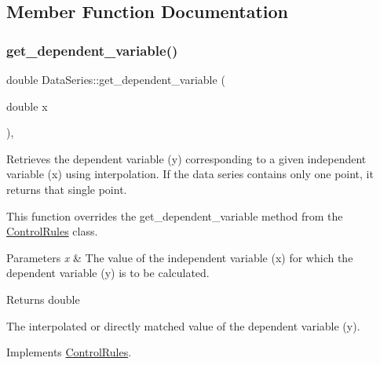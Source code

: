 \subsection{Member Function Documentation}
\mbox{\label{classDataSeries_a3cb684ebcbdd6d9969996f306bed8b53}} 
\subsubsection{\texorpdfstring{get\+\_\+dependent\+\_\+variable()}{get\_dependent\_variable()}\hspace{0.1cm}{\footnotesize\ttfamily [1/2]}}
{\footnotesize\ttfamily double Data\+Series\+::get\+\_\+dependent\+\_\+variable (\begin{DoxyParamCaption}\item[{double}]{x }\end{DoxyParamCaption})\hspace{0.3cm}{\ttfamily [override]}, {\ttfamily [virtual]}}



Retrieves the dependent variable ({\ttfamily y}) corresponding to a given independent variable ({\ttfamily x}) using interpolation. If the data series contains only one point, it returns that single point. 

This function overrides the {\ttfamily get\+\_\+dependent\+\_\+variable} method from the {\ttfamily \mbox{\hyperlink{classControlRules}{Control\+Rules}}} class.


\begin{DoxyParams}{Parameters}
{\em x} & The value of the independent variable ({\ttfamily x}) for which the dependent variable ({\ttfamily y}) is to be calculated.\\
\hline
\end{DoxyParams}
\begin{DoxyReturn}{Returns}
double 

The interpolated or directly matched value of the dependent variable ({\ttfamily y}). 
\end{DoxyReturn}


Implements \mbox{\hyperlink{classControlRules}{Control\+Rules}}.

\mbox{\label{classDataSeries_a57c3737304a489a3ae9cae5910fc5337}} 
